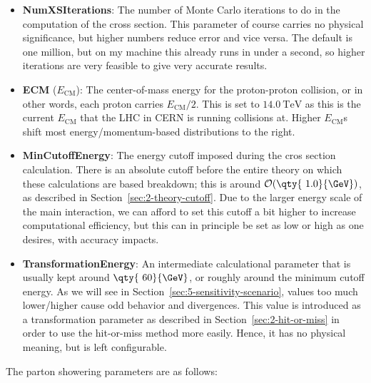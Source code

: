 \begin{itemize}
\item \textbf{NumXSIterations}: The number of Monte Carlo iterations to do in the computation of the cross section. This parameter of course carries no physical significance, but higher numbers reduce error and vice versa. The default is one million, but on my machine this already runs in under a second, so higher iterations are very feasible to give very accurate results.
\item \textbf{ECM} ($E_{\mathrm{CM}}$): The center-of-mass energy for the proton-proton collision, or in other words, each proton carries $E_{\mathrm{CM}}/2$. This is set to $\qty{14.0}{\TeV}$ as this is the current $E_{\mathrm{CM}}$ that the LHC in CERN is running collisions at. Higher $E_{\mathrm{CM}}$s shift most energy/momentum-based distributions to the right.
\item \textbf{MinCutoffEnergy}: The energy cutoff imposed during the cros section calculation. There is an absolute cutoff before the entire theory on which these calculations are based breakdown; this is around $\mathcal{O}(\qty{~1.0}{\GeV})$, as described in Section~\ref{sec:2-theory-cutoff}. Due to the larger energy scale of the main interaction, we can afford to set this cutoff a bit higher to increase computational efficiency, but this can in principle be set as low or high as one desires, with accuracy impacts.
\item \textbf{TransformationEnergy}: An intermediate calculational parameter that is usually kept around $\qty{~60}{\GeV}$, or roughly around the minimum cutoff energy. As we will see in Section~\ref{sec:5-sensitivity-scenario}, values too much lower/higher cause odd behavior and divergences. This value is introduced as a transformation parameter as described in Section~\ref{sec:2-hit-or-miss} in order to use the hit-or-miss method more easily. Hence, it has no physical meaning, but is left configurable.
\end{itemize}


The parton showering parameters are as follows:

